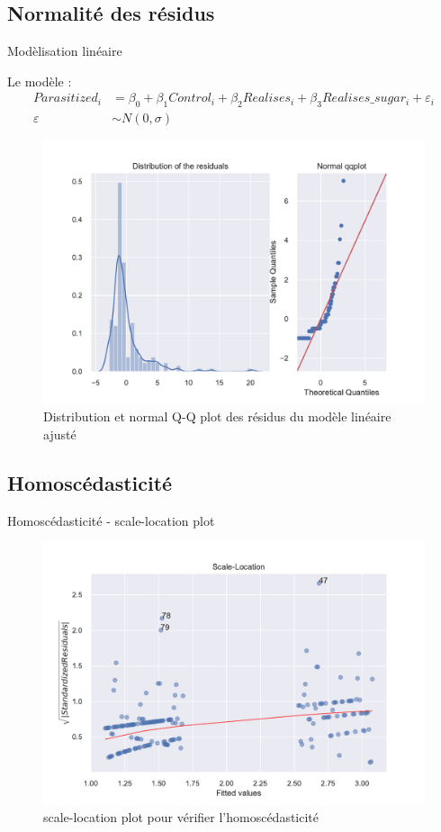 \documentclass[aspectratio=1610]{beamer}
\begin{document}
\subsection{Normalité des résidus}
\begin{frame}{Modèlisation linéaire}

Le modèle :
\begin{align*}
Parasitized_i &= \beta_0 + \beta_1 Control_i + \beta_2 Realises_i + \beta_3 Realises\_sugar_i + \varepsilon_i \\
\varepsilon &\sim N(0, \sigma)
\tag{3}
\end{align*}

\begin{figure}[h]
\centering
 \includegraphics[width=.5\textwidth]{Distribution and normal QQ plot residuals .pdf}
 \caption{Distribution et normal Q-Q plot des résidus du modèle linéaire ajusté} 
 \label{norm_qq}
 \end{figure}

\end{frame}


\subsection{Homoscédasticité}
\begin{frame}{Homoscédasticité - scale-location plot}

\begin{figure}[h]
\centering
 \includegraphics[width=.7\textwidth]{scale-location plot.pdf}
 \caption{scale-location plot pour vérifier l'homoscédasticité} 
 \label{homosc}
 \end{figure}
\end{frame}
\end{document}
